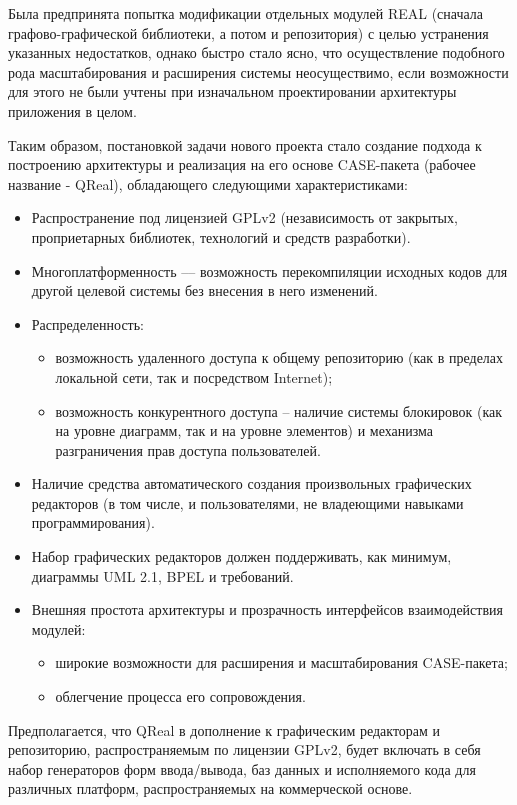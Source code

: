 \documentclass[a5paper]{article}
\begin{document}
Была предпринята попытка модификации отдельных модулей
REAL (сначала графово-графической библиотеки, а потом и репозитория) с целью устранения указанных
недостатков, однако быстро стало ясно, что осуществление подобного рода
масштабирования и расширения системы неосуществимо, если возможности
для этого не были учтены при изначальном проектировании архитектуры
приложения в целом. 

Таким образом, постановкой задачи нового проекта стало создание подхода
к построению архитектуры и реализация на его основе
CASE-пакета (рабочее название - QReal), обладающего следующими характеристиками:

\begin{itemize}
  \item Распространение под лицензией GPLv2
	(независимость от закрытых, проприетарных библиотек, технологий и
	средств разработки).
  \item Многоплатформенность --– возможность перекомпиляции исходных кодов для
	другой целевой системы без внесения в него изменений.
  \item Распределенность:
  \begin{itemize}
	\item 
	  возможность удаленного доступа к общему репозиторию (как в пределах
	  локальной сети, так и посредством Internet);
	\item возможность конкурентного доступа – наличие системы блокировок (как на
	  уровне диаграмм, так и на уровне элементов) и механизма разграничения
	  прав доступа пользователей.
  \end{itemize}
  \item Наличие средства автоматического создания произвольных графических
	редакторов (в том числе, и пользователями, не владеющими навыками
	программирования).
  \item Набор графических редакторов должен поддерживать, как
	минимум, диаграммы UML 2.1, BPEL и требований.
  \item Внешняя простота архитектуры и прозрачность интерфейсов взаимодействия
	модулей:
  \begin{itemize}
	\item широкие возможности для расширения и масштабирования
	  CASE-пакета;
	\item облегчение процесса его сопровождения.
  \end{itemize}
\end{itemize}

Предполагается, что QReal в дополнение к
графическим редакторам и репозиторию, распространяемым по лицензии
GPLv2, будет включать в себя набор
генераторов форм ввода/вывода, баз данных и исполняемого кода для
различных платформ, распространяемых на коммерческой основе.
\end{document}
